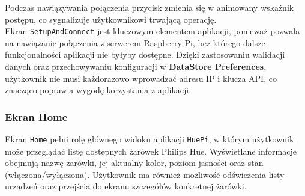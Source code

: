 \documentclass[12pt]{article}
\begin{document}
\clearpage
\noindent Podczas nawiązywania połączenia przycisk zmienia się w animowany wskaźnik postępu, co sygnalizuje użytkownikowi trwającą operację.\\
Ekran \texttt{SetupAndConnect} jest kluczowym elementem aplikacji, ponieważ pozwala na nawiązanie połączenia z serwerem Raspberry Pi, bez którego dalsze funkcjonalności aplikacji nie byłyby
dostępne. Dzięki zastosowaniu walidacji danych oraz przechowywaniu konfiguracji w \textbf{DataStore Preferences}, użytkownik nie musi każdorazowo wprowadzać adresu IP i klucza API, co znacząco
poprawia wygodę korzystania z aplikacji.


\clearpage
\subsubsection{Ekran Home}
Ekran \texttt{Home} pełni rolę głównego widoku aplikacji \texttt{HuePi}, w którym użytkownik może przeglądać listę dostępnych żarówek Philips Hue. Wyświetlane informacje obejmują nazwę żarówki,
jej aktualny kolor, poziom jasności oraz stan (włączona/wyłączona). Użytkownik ma również możliwość odświeżenia listy urządzeń oraz przejścia do ekranu szczegółów konkretnej żarówki.
\end{document}
